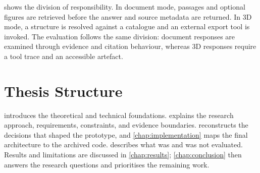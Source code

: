  shows the division of responsibility. In document mode, passages and optional figures are retrieved before the answer and source metadata are returned. In 3D mode, a structure is resolved against a catalogue and an external export tool is invoked. The evaluation follows the same division: document responses are examined through evidence and citation behaviour, whereas 3D responses require a tool trace and an accessible artefact.

\section{Thesis Structure}
\label{sec:introduction-structure}

 introduces the theoretical and technical foundations.  explains the research approach, requirements, constraints, and evidence boundaries.  reconstructs the decisions that shaped the prototype, and \cref{chap:implementation} maps the final architecture to the archived code.  describes what was and was not evaluated. Results and limitations are discussed in \cref{chap:results}; \cref{chap:conclusion} then answers the research questions and prioritises the remaining work.
